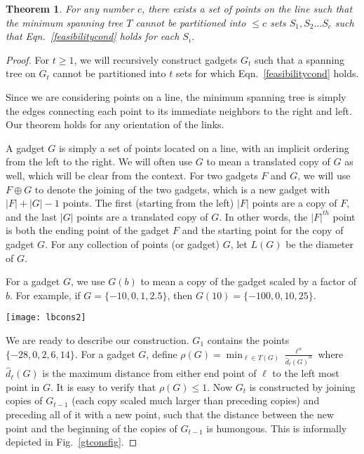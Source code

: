 \documentclass[11pt]{amsart}
\newcounter{foo}
\newtheorem{theorem}[foo]{Theorem}
\begin{document}
\begin{theorem}
For any number $c$, there exists a set of points on the line such that the minimum spanning tree $T$ cannot be 
partitioned into $\leq c$ sets $S_1, S_2 \ldots S_c$ such that Eqn.~\ref{feasibilitycond} holds for each $S_i$.
\end{theorem}
\begin{proof}
For $t \geq 1$, we will recursively construct gadgets $G_t$ such that a spanning tree on $G_t$ cannot be partitioned into $t$
sets for which Eqn.~\ref{feasibilitycond} holds. 

Since we are considering points on a line, the minimum spanning tree is simply
the edges connecting each point to its immediate neighbors to the right and left. Our theorem holds
for any orientation of the links.

A gadget $G$ is simply a set of points located on a line, with an implicit ordering from the left to the right. We will often use $G$ to mean a translated copy
of $G$ as well, which will be clear from the context.
For two gadgets $F$ and $G$, we will use $F \oplus G$
to denote the joining of the two gadgets, which is a new gadget with $|F| + |G| -1$ points. The first (starting from the left) $|F|$ points
are a copy of $F$, and the last $|G|$ points are a translated copy of $G$. In other words, the $|F|^{th}$ point is both
the ending point of the gadget $F$ and the starting point for the copy of gadget $G$. For any collection
of points (or gadget) $G$, let $L(G)$ be the diameter of $G$.

For a gadget $G$, we use $G(b)$ to mean a copy of the gadget scaled by a factor of $b$. For example,
if $G = \{-10, 0, 1, 2.5\}$, then $G(10) = \{-100, 0, 10, 25\}$.


\begin{figure*}
\begin{center}
\texttt{[image: lbcons2]}
\caption{Construction of $G_t$ from copies of $G_{t-1}$. We join a number of copies of $G_{t-1}$, each succeeding copy
scaled must larger than all the copies before it combined. All this is preceded by a huge new link between points $-B(t)$ and $0$ ($B(t)$ is very large)}
\label{gtconsfig}
\end{center}
\end{figure*}


We are ready to describe our construction. $G_1$ contains the points $\{-28, 0, 2, 6, 14\}$.
For a gadget $G$, define $\rho(G) = \min_{\ell \in T(G)} \frac{\ell^{\alpha}}{{\hat d_{\ell}(G)}^{\alpha}}$ where
$\hat d_{\ell}(G)$ is the maximum distance from either end point of $\ell$ to the left most point in $G$. 
It is easy to verify that $\rho(G) \leq 1$.
Now $G_t$ is constructed by joining copies of $G_{t-1}$ (each copy scaled much larger than preceding copies) and preceding all of it with a new point, such that
the distance between the new point and the beginning of the copies of $G_{t-1}$ is humongous. This
is informally depicted in Fig.~\ref{gtconsfig}. 


\end{proof}
\end{document}
